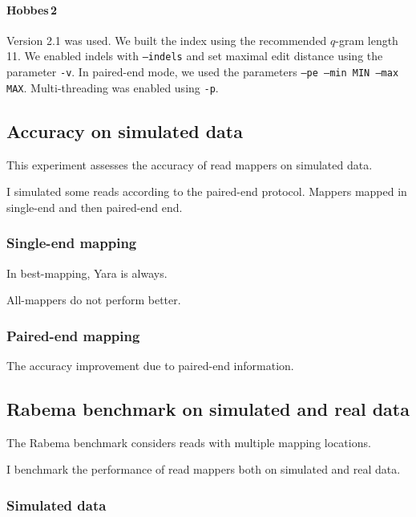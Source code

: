 \paragraph{Hobbes\,2}
Version 2.1 was used.
We built the index using the recommended $q$-gram length 11.
We enabled indels with \texttt{--indels} and set maximal edit distance using the parameter \texttt{-v}.
In paired-end mode, we used the parameters \texttt{--pe --min MIN --max MAX}.
Multi-threading was enabled using \texttt{-p}.

\subsection{Accuracy on simulated data}

This experiment assesses the accuracy of read mappers on simulated data.

I simulated some reads according to the paired-end protocol.
Mappers mapped in single-end and then paired-end end.

\subsubsection{Single-end mapping}

In best-mapping, Yara is always.

All-mappers do not perform better.

\subsubsection{Paired-end mapping}

The accuracy improvement due to paired-end information.

\subsection{Rabema benchmark on simulated and real data}

The Rabema benchmark considers reads with multiple mapping locations.

I benchmark the performance of read mappers both on simulated and real data.

\subsubsection{Simulated data}
